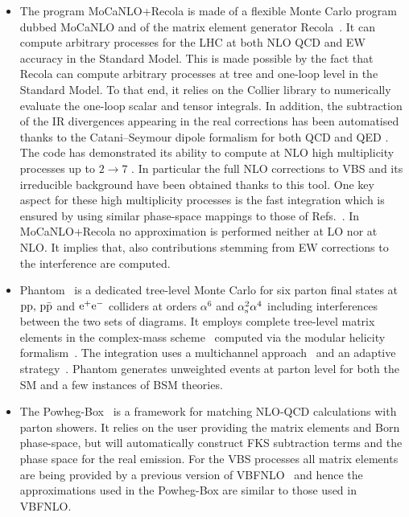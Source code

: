 \begin{itemize}
\item The program {\sc MoCaNLO+Recola} is made of a flexible Monte Carlo program dubbed {\sc MoCaNLO} and of the matrix element generator {\sc Recola}~\cite{Actis:2012qn,Actis:2016mpe}.
It can compute arbitrary processes for the LHC at both NLO QCD and EW accuracy in the Standard Model.
This is made possible by the fact that {\sc Recola} can compute arbitrary processes at tree and one-loop level in the Standard Model.
To that end, it relies on the {\sc Collier} library \cite{Denner:2014gla,Denner:2016kdg} to numerically evaluate the one-loop scalar and tensor integrals.
In addition, the subtraction of the IR divergences appearing in the real corrections has been automatised thanks to the Catani--Seymour dipole formalism for both QCD and QED \cite{Catani:1996vz,Dittmaier:1999mb}.
The code has demonstrated its ability to compute at NLO high multiplicity processes up to $2 \to 7$ \cite{Denner:2015yca,Denner:2016wet}.
In particular the full NLO corrections to VBS and its irreducible background \cite{Biedermann:2016yds,Biedermann:2017bss} have been obtained thanks to this tool.
One key aspect for these high multiplicity processes is the fast integration which is ensured by using similar phase-space mappings to those of Refs.~\cite{Berends:1994pv,Denner:1999gp,Dittmaier:2002ap}. 
In {\sc MoCaNLO+Recola} no approximation is performed neither at LO nor at NLO.
It implies that, also contributions stemming from EW corrections to the interference are computed.
        
  \item {\sc Phantom}~\cite{Ballestrero:2007xq} is a dedicated tree-level Monte Carlo for six parton final states 
  at $\text{p} \text{p},\, \text{p}\bar{\text{p}}$ and $\text{e}^+\text{e}^-$ colliders at orders $\alpha^6$ and $\alpha_\text{s}^2\alpha^4$ including interferences between the two sets of diagrams.
It employs complete tree-level matrix elements in the complex-mass scheme~\cite{Denner:1999gp,Denner:2005fg,Denner:2006ic} computed via the modular helicity formalism~\cite{Ballestrero:1999md,Ballestrero:1994jn}.
The integration uses a multichannel approach~\cite{Berends:1984gf} and an adaptive strategy~\cite{Lepage:1977sw}.
{\sc Phantom} generates unweighted events at parton level for both the SM and a few instances of BSM theories.

  \item The {\sc Powheg-Box}~\cite{Alioli:2010xd,Frixione:2007vw,Nason:2006hfa} is a framework for matching NLO-QCD calculations with parton showers.
It relies on the user providing the matrix elements and Born phase-space, but will automatically construct FKS \cite{Frixione:1995ms} subtraction terms and the phase space for the real emission.
For the VBS processes all matrix elements are being provided by a previous version of {\sc VBFNLO}~\cite{Arnold:2008rz, Arnold:2011wj, Baglio:2014uba} and hence the approximations used in the {\sc Powheg-Box} are similar to those used in {\sc VBFNLO}.


\end{itemize}
